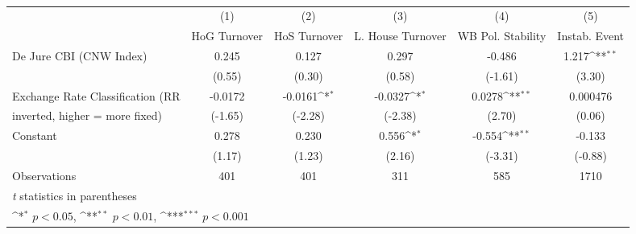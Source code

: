 \begin{table}[htbp]\centering
\def\sym#1{\ifmmode^{#1}\else\(^{#1}\)\fi}
\caption{\label{nondemocraciesFEDJ}}
\begin{tabular}{l*{5}{c}}
\toprule
                                        &\multicolumn{1}{c}{(1)}&\multicolumn{1}{c}{(2)}&\multicolumn{1}{c}{(3)}&\multicolumn{1}{c}{(4)}&\multicolumn{1}{c}{(5)}\\
                                        &\multicolumn{1}{c}{HoG Turnover}&\multicolumn{1}{c}{HoS Turnover}&\multicolumn{1}{c}{L. House Turnover}&\multicolumn{1}{c}{WB Pol. Stability}&\multicolumn{1}{c}{Instab. Event}\\
\midrule
De Jure CBI (CNW Index)                 &    0.245         &    0.127         &    0.297         &   -0.486         &    1.217\sym{**} \\
                                        &   (0.55)         &   (0.30)         &   (0.58)         &  (-1.61)         &   (3.30)         \\
\addlinespace
Exchange Rate Classification (RR        &  -0.0172         &  -0.0161\sym{*}  &  -0.0327\sym{*}  &   0.0278\sym{**} & 0.000476         \\
inverted, higher = more fixed)          &  (-1.65)         &  (-2.28)         &  (-2.38)         &   (2.70)         &   (0.06)         \\
\addlinespace
Constant                                &    0.278         &    0.230         &    0.556\sym{*}  &   -0.554\sym{**} &   -0.133         \\
                                        &   (1.17)         &   (1.23)         &   (2.16)         &  (-3.31)         &  (-0.88)         \\
\midrule
Observations                            &      401         &      401         &      311         &      585         &     1710         \\
\bottomrule
\multicolumn{6}{l}{\footnotesize \textit{t} statistics in parentheses}\\
\multicolumn{6}{l}{\footnotesize \sym{*} \(p<0.05\), \sym{**} \(p<0.01\), \sym{***} \(p<0.001\)}\\
\end{tabular}
\end{table}
